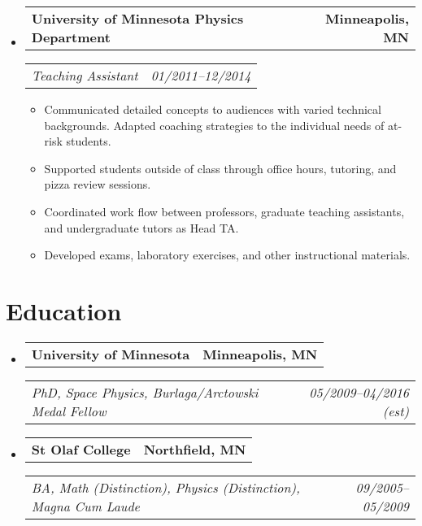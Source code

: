 \documentclass[11pt,letterpaper]{article}
\makeatletter
\newcommand{\headerrow}[2]{
  \begin{tabular*}{\linewidth}{l@{ \extracolsep{\fill} }r} #1 & #2 
  \end{tabular*}}
\newcommand{\YearRange}[2]{#1--#2}
\newcommand{\ResumeSection}[1]{
  \section*{ {\color{MidnightBlue}#1 \sout{\hfill} } } }
\makeatother
\begin{document}
\begin{itemize}[leftmargin=\parindent]
  \item[]
    \headerrow{ \textbf{University of Minnesota Physics Department} }
              { \textbf{Minneapolis, MN} }
    \headerrow{ \emph{Teaching Assistant} }
              { \emph{ \YearRange{01/2011}{12/2014} } }
    \begin{itemize}
      \item Communicated detailed concepts to audiences with varied technical
            backgrounds. Adapted coaching strategies to the individual needs of
            at-risk students. 
      \item Supported students outside of class through office hours, tutoring,
            and pizza review sessions. 
      \item Coordinated work flow between professors, graduate teaching
            assistants, and undergraduate tutors as Head TA. 
      \item Developed exams, laboratory exercises, and other instructional
            materials. 
    \end{itemize}

\end{itemize}


\ResumeSection{Education}

\begin{itemize}[leftmargin=\parindent]
  \parskip=0.1em

  \item[]
    \headerrow{ \textbf{University of Minnesota} }{ \textbf{Minneapolis, MN} }
    \headerrow{ \emph{PhD, Space Physics, Burlaga/Arctowski Medal Fellow} }
              { \emph{ \YearRange{05/2009}{04/2016 (est)} } }

    \item[]
      \headerrow{ \textbf{St Olaf College} }{ \textbf{Northfield, MN} }
      \headerrow{ \emph{BA, Math (Distinction), Physics (Distinction), 
                 Magna Cum Laude} }
                { \emph{ \YearRange{09/2005}{05/2009} } }

\end{itemize}


\end{document}
